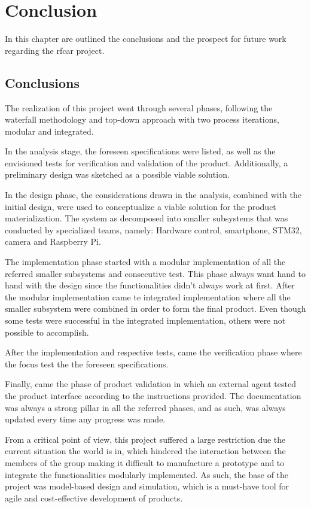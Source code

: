 \chapter{Conclusion}%
\label{ch:conclusion}
In this chapter are outlined the conclusions and the prospect for future work
regarding the \gls{rfcar} project.
%
\section{Conclusions}%
\label{ch:conclusion-concls}
The realization of this project went through several phases, following the
waterfall methodology and top-down approach with two process iterations, modular
and integrated.

In the analysis stage, the foreseen specifications were listed, as well as the
envisioned tests for verification and validation of the product. Additionally, a
preliminary design was sketched as a possible viable solution.

In the design phase, the considerations drawn in the analysis, combined with the
initial design, were used to conceptualize a viable solution for the product
materialization. The system as decomposed into smaller subsystems that was
conducted by specialized teams, namely: Hardware control, smartphone, STM32,
camera and Raspberry Pi.

The implementation phase started with a modular implementation of all the
referred smaller subsystems and consecutive test. This phase always want hand to
hand with the design since the functionalities didn't always work at
first. After the modular implementation came te integrated implementation where
all the smaller subsystem were combined in order to form the final product. Even
though some tests were successful in the integrated implementation, others were
not possible to accomplish.

After the implementation and respective tests, came the verification phase where
the focus test the the foreseen specifications.

Finally, came the phase of product validation in which an external agent tested the product interface according to the instructions provided.
The documentation was always a strong pillar in all the referred phases, and as
such, was always updated every time any progress was made.

From a critical point of view, this project suffered a large restriction due the
current situation the world is in, which hindered the interaction between the
members of the group making it difficult to manufacture a prototype and to
integrate the functionalities modularly implemented. As such, the base of the
project was model-based design and simulation, which is a must-have tool for
agile and cost-effective development of products.

